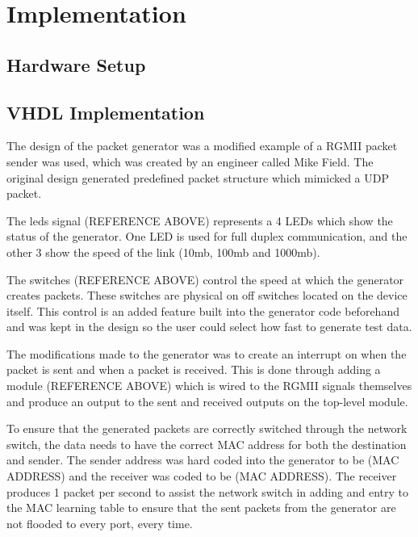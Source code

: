 \chapter{Implementation}\label{C:impl}

\section{Hardware Setup}

\section{VHDL Implementation}

The design of the packet generator was a modified example of a RGMII packet sender was used, which was created by an 
engineer called Mike Field. The original design generated predefined packet structure which mimicked a UDP packet. 



The leds signal (REFERENCE ABOVE) represents a 4 LEDs which show the status of the generator. One LED is used for 
full duplex communication, and the other 3 show the speed of the link (10mb, 100mb and 1000mb). 



The switches (REFERENCE ABOVE) control the speed at which the generator creates packets. These switches are physical 
on off switches located on the device itself.  This control is an added feature built into the generator code 
beforehand and was kept in the design so the user could select how fast to generate test data.



The modifications made to the generator was to create an interrupt on when the packet is sent and when a packet is 
received. This is done through adding a module (REFERENCE ABOVE) which is wired to the RGMII signals themselves and 
produce an output to the sent and received outputs on the top-level module.



To ensure that the generated packets are correctly switched through the network switch, the data needs to have the 
correct MAC address for both the destination and sender. The sender address was hard coded into the generator to be 
(MAC ADDRESS) and the receiver was coded to be (MAC ADDRESS). The receiver produces 1 packet per second to assist 
the network switch in adding and entry to the MAC learning table to ensure that the sent packets from the generator 
are not flooded to every port, every time. 

